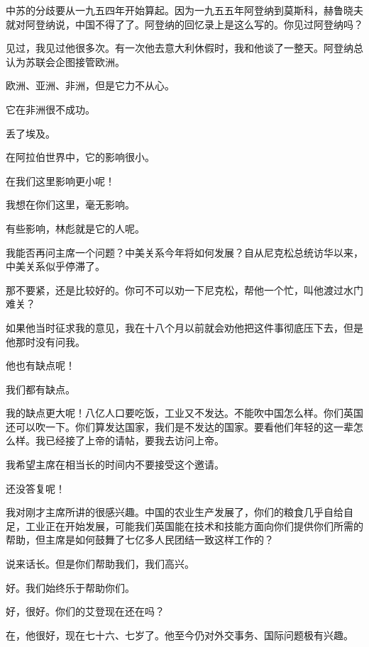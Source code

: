 中苏的分歧要从一九五四年开始算起。因为一九五五年阿登纳到莫斯科，赫鲁晓夫就对阿登纳说，中国不得了了。阿登纳的回忆录上是这么写的。你见过阿登纳吗？

见过，我见过他很多次。有一次他去意大利休假时，我和他谈了一整天。阿登纳总认为苏联会企图接管欧洲。

欧洲、亚洲、非洲，但是它力不从心。

它在非洲很不成功。

丢了埃及。

在阿拉伯世界中，它的影响很小。

在我们这里影响更小呢！

我想在你们这里，毫无影响。

有些影响，林彪就是它的人呢。

我能否再问主席一个问题？中美关系今年将如何发展？自从尼克松总统访华以来，中美关系似乎停滞了。

那不要紧，还是比较好的。你可不可以劝一下尼克松，帮他一个忙，叫他渡过水门难关？

如果他当时征求我的意见，我在十八个月以前就会劝他把这件事彻底压下去，但是他那时没有问我。

他也有缺点呢！

我们都有缺点。

我的缺点更大呢！八亿人口要吃饭，工业又不发达。不能吹中国怎么样。你们英国还可以吹一下。你们算发达国家，我们是不发达的国家。要看他们年轻的这一辈怎么样。我已经接了上帝的请帖，要我去访问上帝。

我希望主席在相当长的时间内不要接受这个邀请。

还没答复呢！

我对刚才主席所讲的很感兴趣。中国的农业生产发展了，你们的粮食几乎自给自足，工业正在开始发展，可能我们英国能在技术和技能方面向你们提供你们所需的帮助，但主席是如何鼓舞了七亿多人民团结一致这样工作的？

说来话长。但是你们帮助我们，我们高兴。

好。我们始终乐于帮助你们。

好，很好。你们的艾登现在还在吗？

在，他很好，现在七十六、七岁了。他至今仍对外交事务、国际问题极有兴趣。

